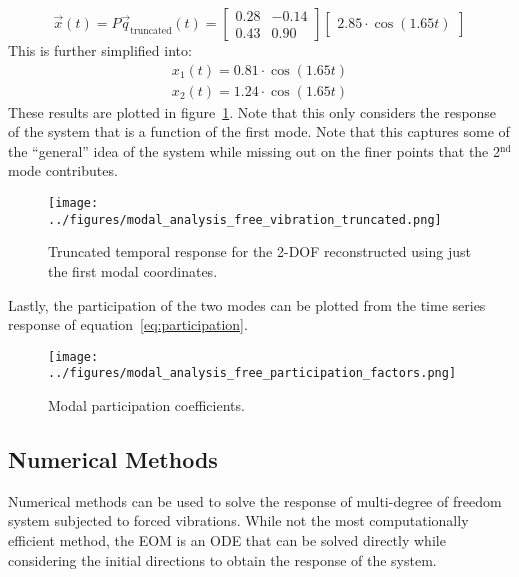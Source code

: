 \documentclass[12pt,letter]{article}
\begin{document}
\begin{example}
	\begin{equation}
	\vec{x}(t) = P\vec{q}_\text{truncated}(t) = \begin{bmatrix} 0.28 & -0.14 \\    0.43  & 0.90 \end{bmatrix}  \begin{bmatrix} 2.85 \cdot \cos (1.65 t) \end{bmatrix}
	\end{equation}
	This is further simplified into:
	\begin{eqnarray}
	x_1(t) = 0.81 \cdot \cos (1.65 t) \\ 
	x_2(t) = 1.24 \cdot \cos (1.65 t) \nonumber
	\end{eqnarray}
	These results are plotted in figure~\ref{fig:modal_analysis_free_vibration_truncated}. Note that this only considers the response of the system that is a function of the first mode. Note that this captures some of the ``general'' idea of the system while missing out on the finer points that the 2$^{\text{nd}}$ mode contributes. 
	
	\begin{figure}[H]
		\centering
		\texttt{[image: ../figures/modal\_analysis\_free\_vibration\_truncated.png]}
		\caption{Truncated temporal response for the 2-DOF reconstructed using just the first modal coordinates.}
		\label{fig:modal_analysis_free_vibration_truncated}
	\end{figure}
	
	Lastly, the participation of the two modes can be plotted from the time series response of equation~\ref{eq:participation}.
	
	\begin{figure}[H]
		\centering
		\texttt{[image: ../figures/modal\_analysis\_free\_participation\_factors.png]}
		\caption{Modal participation coefficients.}
		\label{fig:modal_analysis_free_participation_factors}
	\end{figure}
	
	
	
	\end{example}
	
\pagebreak
		\subsection{Numerical Methods}
		
			Numerical methods can be used to solve the response of multi-degree of freedom system subjected to forced vibrations. While not the most computationally efficient method, the EOM is an ODE that can be solved directly while considering the initial directions to obtain the response of the system. 
			
\end{document}
